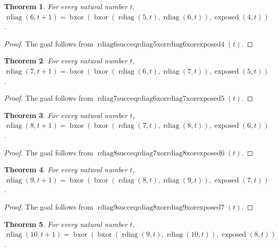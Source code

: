 \documentclass[11pt]{article}
\newtheorem{theorem}{Theorem}[section]
\theoremstyle{definition}
\begin{document}
\begin{theorem}
\label{ll:observations:rdiag6-succ-eq-rdiag5-xor-rdiag6-xor-exposed4}
For every natural number \(t\), \(\operatorname{rdiag}(6, t + 1) = \operatorname{bxor}(\operatorname{bxor}(\operatorname{rdiag}(5, t), \operatorname{rdiag}(6, t)), \operatorname{exposed}(4, t))\).
\end{theorem}
\begin{proof}
The goal follows from \(\operatorname{rdiag6succeqrdiag5xorrdiag6xorexposed4}(t)\).
\end{proof}
\begin{theorem}
\label{ll:observations:rdiag7-succ-eq-rdiag6-xor-rdiag7-xor-exposed5}
For every natural number \(t\), \(\operatorname{rdiag}(7, t + 1) = \operatorname{bxor}(\operatorname{bxor}(\operatorname{rdiag}(6, t), \operatorname{rdiag}(7, t)), \operatorname{exposed}(5, t))\).
\end{theorem}
\begin{proof}
The goal follows from \(\operatorname{rdiag7succeqrdiag6xorrdiag7xorexposed5}(t)\).
\end{proof}
\begin{theorem}
\label{ll:observations:rdiag8-succ-eq-rdiag7-xor-rdiag8-xor-exposed6}
For every natural number \(t\), \(\operatorname{rdiag}(8, t + 1) = \operatorname{bxor}(\operatorname{bxor}(\operatorname{rdiag}(7, t), \operatorname{rdiag}(8, t)), \operatorname{exposed}(6, t))\).
\end{theorem}
\begin{proof}
The goal follows from \(\operatorname{rdiag8succeqrdiag7xorrdiag8xorexposed6}(t)\).
\end{proof}
\begin{theorem}
\label{ll:observations:rdiag9-succ-eq-rdiag8-xor-rdiag9-xor-exposed7}
For every natural number \(t\), \(\operatorname{rdiag}(9, t + 1) = \operatorname{bxor}(\operatorname{bxor}(\operatorname{rdiag}(8, t), \operatorname{rdiag}(9, t)), \operatorname{exposed}(7, t))\).
\end{theorem}
\begin{proof}
The goal follows from \(\operatorname{rdiag9succeqrdiag8xorrdiag9xorexposed7}(t)\).
\end{proof}
\begin{theorem}
\label{ll:observations:rdiag10-succ-eq-rdiag9-xor-rdiag10-xor-exposed8}
For every natural number \(t\), \(\operatorname{rdiag}(10, t + 1) = \operatorname{bxor}(\operatorname{bxor}(\operatorname{rdiag}(9, t), \operatorname{rdiag}(10, t)), \operatorname{exposed}(8, t))\).
\end{theorem}
\end{document}
